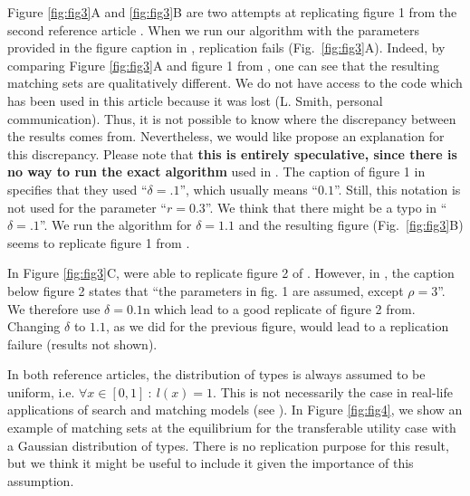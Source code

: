 Figure \ref{fig:fig3}A and \ref{fig:fig3}B are two attempts at replicating figure 1 from the second reference article \citep{smith_marriage_2006}. When we run our algorithm with the parameters provided in the figure caption in \citep{smith_marriage_2006}, replication fails (Fig.~\ref{fig:fig3}A). Indeed, by comparing Figure \ref{fig:fig3}A and figure 1 from \citep{smith_marriage_2006}, one can see that the resulting matching sets are qualitatively different. We do not have access to the code which has been used in this article because it was lost (L. Smith, personal communication). Thus, it is not possible to know where the discrepancy between the results comes from. Nevertheless, we would like propose an explanation for this discrepancy. Please note that \textbf{this is entirely speculative, since there is no way to run the exact algorithm} used in \citep{smith_marriage_2006}. The caption of figure 1 in \citep{smith_marriage_2006} specifies that they used ``$\delta=.1$'', which usually means ``$0.1$''. Still, this notation is not used for the parameter ``$r=0.3$''. We think that there might be a typo in ``$\delta=.1$''. We run the algorithm for $\delta=1.1$ and the resulting figure (Fig.~\ref{fig:fig3}B) seems to replicate figure 1 from \citep{smith_marriage_2006}.

In Figure \ref{fig:fig3}C, were able to replicate figure 2 of \citep{smith_marriage_2006}. However, in \citep{smith_marriage_2006}, the caption below figure 2 states that ``the parameters in fig. 1 are assumed, except $\rho=3$''. We therefore use $\delta=0.1$n which lead to a good replicate of figure 2 from\citep{smith_marriage_2006}. Changing $\delta$ to $1.1$, as we did for the previous figure, would lead to a replication failure (results not shown).

In both reference articles, the distribution of types is always assumed to be uniform, i.e. $\forall x \in [0,1] \ : \ l(x)=1$. This is not necessarily the case in real-life applications of search and matching models (see \citep{hagedorn_identifying_2017}). In Figure \ref{fig:fig4}, we show an example of matching sets at the equilibrium for the transferable utility case with a Gaussian distribution of types. There is no replication purpose for this result, but we think it might be useful to include it given the importance of this assumption.

\def \smallScl {0.15}
\def \mediumScl {0.2}
\def \largeScl {0.3}




